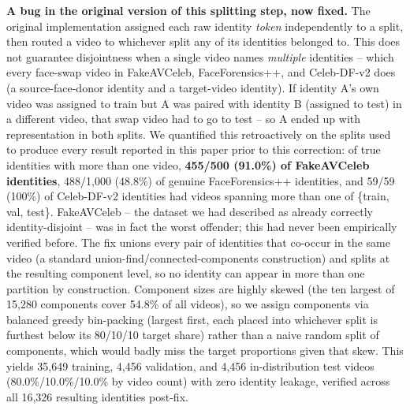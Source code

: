 \documentclass[conference]{IEEEtran}
\begin{document}
\textbf{A bug in the original version of this splitting step, now fixed.}
The original implementation assigned each raw identity \emph{token}
independently to a split, then routed a video to whichever split any of its
identities belonged to. This does not guarantee disjointness when a single
video names \emph{multiple} identities -- which every face-swap video in
FakeAVCeleb, FaceForensics++, and Celeb-DF-v2 does (a source-face-donor
identity and a target-video identity). If identity A's own video was
assigned to train but A was paired with identity B (assigned to test) in a
different video, that swap video had to go to test -- so A ended up with
representation in both splits. We quantified this retroactively on the
splits used to produce every result reported in this paper prior to this
correction: of true identities with more than one video, \textbf{455/500
(91.0\%) of FakeAVCeleb identities}, 488/1{,}000 (48.8\%) of genuine
FaceForensics++ identities, and 59/59 (100\%) of Celeb-DF-v2 identities had
videos spanning more than one of \{train, val, test\}. FakeAVCeleb -- the
dataset we had described as already correctly identity-disjoint -- was in
fact the worst offender; this had never been empirically verified before.
The fix unions every pair of identities that co-occur in the same video
(a standard union-find/connected-components construction) and splits at the
resulting component level, so no identity can appear in more than one
partition by construction. Component sizes are highly skewed (the ten
largest of 15{,}280 components cover 54.8\% of all videos), so we assign
components via balanced greedy bin-packing (largest first, each placed into
whichever split is furthest below its 80/10/10 target share) rather than a
naive random split of components, which would badly miss the target
proportions given that skew. This yields 35{,}649 training, 4{,}456
validation, and 4{,}456 in-distribution test videos (80.0\%/10.0\%/10.0\% by
video count) with zero identity leakage, verified across all 16{,}326
resulting identities post-fix.
\end{document}
